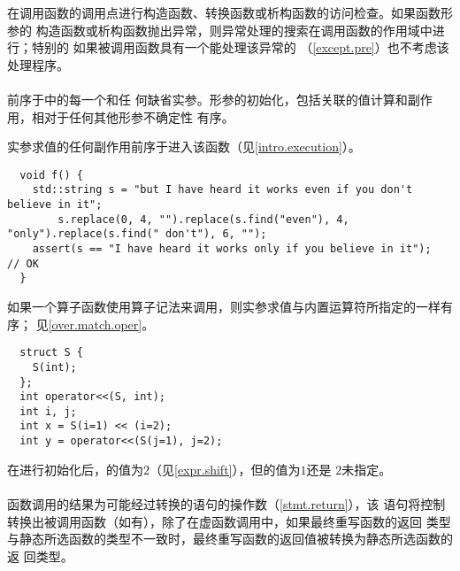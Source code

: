 \begin{example}
  在调用函数的调用点进行构造函数、转换函数或析构函数的访问检查。如果函数形参的
  构造函数或析构函数抛出异常，则异常处理的搜索在调用函数的作用域中进行；特别的
  如果被调用函数具有一个能处理该异常的
  （\ref{except.pre}）也不考虑该处理程序。
\end{example}

\paragraph{} %
前序于中的每一个和任
何缺省实参。形参的初始化，包括关联的值计算和副作用，相对于任何其他形参不确定性
有序。

\begin{note}
  实参求值的任何副作用前序于进入该函数（见\ref{intro.execution}）。
\end{note}

\begin{example}
  \begin{lstlisting}
  void f() {
    std::string s = "but I have heard it works even if you don't believe in it";
		s.replace(0, 4, "").replace(s.find("even"), 4, "only").replace(s.find(" don't"), 6, "");
    assert(s == "I have heard it works only if you believe in it");   // OK
  }
  \end{lstlisting}
\end{example}

\begin{note}
  如果一个算子函数使用算子记法来调用，则实参求值与内置运算符所指定的一样有序；
  见\ref{over.match.oper}。
\end{note}

\begin{example}
  \begin{lstlisting}
  struct S {
    S(int);
  };
  int operator<<(S, int);
  int i, j;
  int x = S(i=1) << (i=2);
  int y = operator<<(S(j=1), j=2);
  \end{lstlisting}

  在进行初始化后，的值为$2$（见\ref{expr.shift}），但的值为$1$还是
  $2$未指定。
\end{example}

\paragraph{} %
函数调用的结果为可能经过转换的语句的操作数（\ref{stmt.return}），该
语句将控制转换出被调用函数（如有），除了在虚函数调用中，如果最终重写函数的返回
类型与静态所选函数的类型不一致时，最终重写函数的返回值被转换为静态所选函数的返
回类型。

